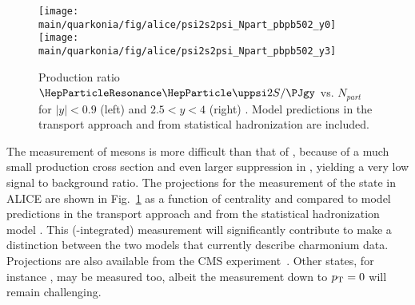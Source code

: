 \documentclass[../report.tex]{subfiles}
\providecommand{\main}{..}
\begin{document}
\begin{figure}[h]
\begin{center}
 \texttt{[image: \\main/quarkonia/fig/alice/psi2s2psi\_Npart\_pbpb502\_y0]}
 \texttt{[image: \\main/quarkonia/fig/alice/psi2s2psi\_Npart\_pbpb502\_y3]}
\end{center}
 \caption{Production ratio $\PGyP{2S}/\PJgy$ vs. $N_{part}$ for $|y|<0.9$ (left) and $2.5<y<4$ (right) \cite{Abelevetal:2014cna,CERN-LHCC-2013-014}. Model predictions in the transport approach \cite{Du:2015wha}  and from statistical hadronization \cite{Andronic:2017pug} are included.}
\label{FigQ:psi2SPbPb}
\end{figure}

The measurement of  mesons is more difficult than that of \PJgy, because of a much small production cross section and even larger suppression in \PbPb, yielding a very low signal to background ratio.
The projections for the measurement of the  state in ALICE are shown in Fig.~\ref{FigQ:psi2SPbPb} as a function of centrality and compared to model predictions in the transport approach \cite{Du:2015wha}  and from the statistical hadronization model \cite{Andronic:2017pug}. This (\pT-integrated) measurement will significantly contribute to make a distinction between the two models that currently describe charmonium data. Projections are also available from the CMS experiment~\cite{CMS-PAS-FTR-17-002}.
Other states, for instance \PGcc, may be measured too, albeit the measurement down to $p\sb{\scriptstyle\mathrm{T}}=0$ will remain challenging.


\end{document}
